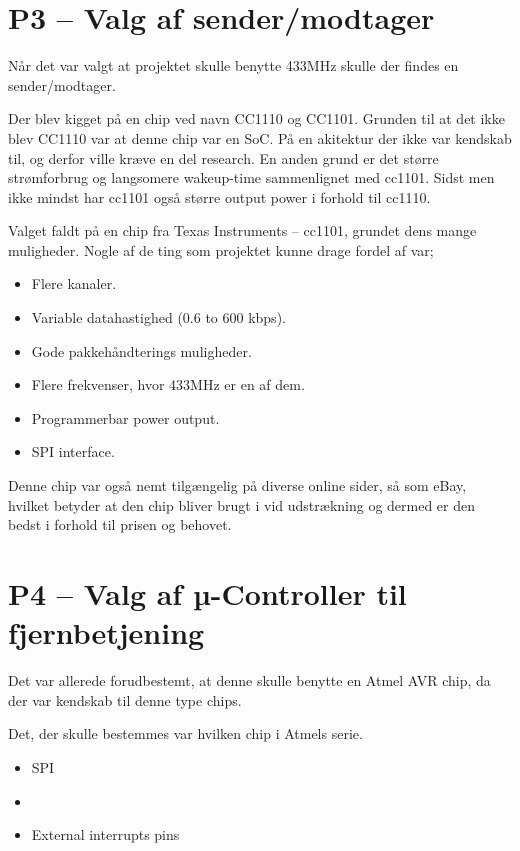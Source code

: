 \documentclass[Main]{subfiles}
\begin{document}
\section[Valg af sender/modtager]{P3 -- Valg af sender/modtager}

Når det var valgt at projektet skulle benytte 433MHz skulle der findes en sender/modtager.

Der blev kigget på en chip ved navn CC1110 og CC1101. Grunden til at det ikke blev CC1110 var at denne chip var en SoC. På en akitektur der ikke var kendskab til, og derfor ville kræve en del research.
En anden grund er det større strømforbrug og langsomere wakeup-time sammenlignet med cc1101. Sidst men ikke mindst har cc1101 også større output power i forhold til cc1110.

Valget faldt på en chip fra Texas Instruments -- cc1101\cite{TI-cc1101}, grundet dens mange muligheder.
Nogle af de ting som projektet kunne drage fordel af var;

\begin{itemize}
\item Flere kanaler.
\item Variable datahastighed (0.6 to 600 kbps).
\item Gode pakkehåndterings muligheder. 
\item Flere frekvenser, hvor 433MHz er en af dem.
\item Programmerbar power output.
\item SPI interface.
\end{itemize}

Denne chip var også nemt tilgængelig på diverse online sider, så som eBay\cite{eBay}, hvilket betyder at den chip bliver brugt i vid udstrækning og dermed er den bedst i forhold til prisen og behovet.




\section[Valg af µ-Controller til fjernbetjening]{P4 -- Valg af µ-Controller til fjernbetjening}

Det var allerede forudbestemt, at denne skulle benytte en Atmel AVR chip, da der var kendskab til denne type chips.

Det, der skulle bestemmes var hvilken chip i Atmels serie.

\begin{itemize}
\item SPI
\item \itoc
\item External interrupts pins
\end{itemize}
\end{document}
